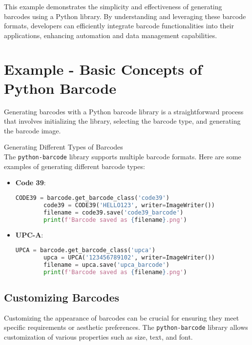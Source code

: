 This example demonstrates the simplicity and effectiveness of generating barcodes using a Python library. By understanding and leveraging these barcode formats, developers can efficiently integrate barcode functionalities into their applications, enhancing automation and data management capabilities.

\section{Example - Basic Concepts of Python Barcode}

Generating barcodes with a Python barcode library is a straightforward process that involves initializing the library, selecting the barcode type, and generating the barcode image.

Generating Different Types of Barcodes\\

The \texttt{python-barcode} library supports multiple barcode formats. Here are some examples of generating different barcode types: \cite{Barrera:2020}

\begin{itemize}
	\item \textbf{Code 39}:
	\begin{lstlisting}[language=Python]
		CODE39 = barcode.get_barcode_class('code39')
		code39 = CODE39('HELLO123', writer=ImageWriter())
		filename = code39.save('code39_barcode')
		print(f'Barcode saved as {filename}.png')
	\end{lstlisting}
	
	\item \textbf{UPC-A}:
	\begin{lstlisting}[language=Python]
		UPCA = barcode.get_barcode_class('upca')
		upca = UPCA('123456789102', writer=ImageWriter())
		filename = upca.save('upca_barcode')
		print(f'Barcode saved as {filename}.png')
	\end{lstlisting}
\end{itemize}

\subsection{Customizing Barcodes}

Customizing the appearance of barcodes can be crucial for ensuring they meet specific requirements or aesthetic preferences. The \texttt{python-barcode} library allows customization of various properties such as size, text, and font.

